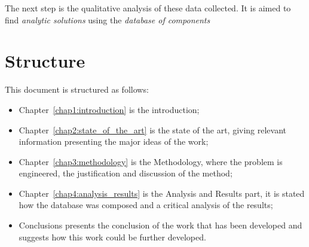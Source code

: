     The next step is the qualitative analysis of these data collected. It is aimed to find \emph{analytic solutions} using the \emph{database of components}


\section{Structure} \label{sec1:structure}
    This document is structured as follows:
    \begin{itemize}
        \item Chapter~\ref{chap1:introduction} is the introduction;
        \item Chapter~\ref{chap2:state_of_the_art} is the state of the art, giving relevant information presenting the major ideas of the work;
        \item Chapter~\ref{chap3:methodology} is the Methodology, where the problem is engineered, the justification and discussion of the method;
        \item Chapter~\ref{chap4:analysis_results} is the Analysis and Results part, it is stated how the database was composed and a critical analysis of the results;
        \item Conclusions presents the conclusion of the work that has been developed and suggests how this work could be further developed.

    \end{itemize}
    
    

